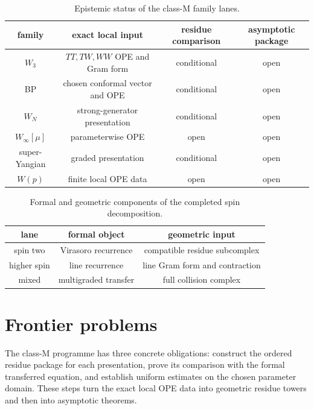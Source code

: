 \begin{table}[htbp]
\centering
\begin{tabular}{c|c|c|c}
family & exact local input & residue comparison & asymptotic package\\
\hline
\(W_3\) & \(TT,TW,WW\) OPE and Gram form & conditional & open\\
BP & chosen conformal vector and OPE & conditional & open\\
\(W_N\) & strong-generator presentation & conditional & open\\
\(W_\infty[\mu]\) & parameterwise OPE & open & open\\
super-Yangian & graded presentation & conditional & open\\
\(W(p)\) & finite local OPE data & open & open
\end{tabular}
\caption{Epistemic status of the class-M family lanes.}
\label{tab:class-m-shadow-summary}
\end{table}

\begin{table}[htbp]
\centering
\begin{tabular}{c|c|c}
lane & formal object & geometric input\\
\hline
spin two & Virasoro recurrence & compatible residue subcomplex\\
higher spin & line recurrence & line Gram form and contraction\\
mixed & multigraded transfer & full collision complex
\end{tabular}
\caption{Formal and geometric components of the completed spin decomposition.}
\label{tab:w-infinity-family-integer}
\end{table}

\section{Frontier problems}
\label{sec:frontier-questions-shadow-tower-other-class-m}

The class-M programme has three concrete obligations: construct the
ordered residue package for each presentation, prove its comparison
with the formal transferred equation, and establish uniform estimates
on the chosen parameter domain.  These steps turn the exact local OPE
data into geometric residue towers and then into asymptotic theorems.
